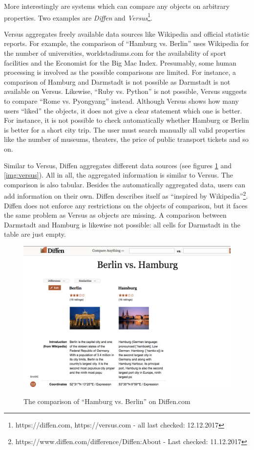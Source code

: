 More interestingly are systems which can compare any objects on arbitrary properties. Two examples are \emph{Diffen} and \emph{Versus}\footnote{https://diffen.com, https://versus.com - all last checked: 12.12.2017}.

Versus aggregates freely available data sources like Wikipedia and official statistic reports. For example, the comparison of \enquote{Hamburg vs. Berlin} uses Wikipedia for the number of universities, worldstadiums.com for the availability of sport facilities and the Economist for the Big Mac Index. Presumably, some human processing is involved as the possible comparisons are limited. For instance, a comparison of Hamburg and Darmstadt is not possible as Darmstadt is not available on Versus. Likewise, \enquote{Ruby vs. Python} is not possible, Versus suggests to compare \enquote{Rome vs. Pyongyang} instead. Although Versus shows how many users \enquote{liked} the objects, it does not give a clear statement which one is better. For instance, it is not possible to check automatically whether Hamburg or Berlin is better for a short city trip. The user must search manually all valid properties like the number of museums, theaters, the price of public transport tickets and so on.

Similar to Versus, Diffen aggregates different data sources (see figures \ref{img:diffen} and \ref{img:versus}). All in all, the aggregated information is similar to Versus. The comparison is also tabular. Besides the automatically aggregated data, users can add information on their own. Diffen describes itself as \enquote{inspired by Wikipedia}\footnote{https://www.diffen.com/difference/Diffen:About - Last checked: 11.12.2017}. Diffen does not enforce any restrictions on the objects of comparison, but it faces the same problem as Versus as objects are missing. A comparison between Darmstadt and Hamburg is likewise not possible: all cells for Darmstadt in the table are just empty.\newline

\begin{figure}[h]
\includegraphics[width=1\textwidth]{images/ds-sys/diffen}
\label{img:diffen}
\caption{The comparison of \enquote{Hamburg vs. Berlin} on Diffen.com}
\end{figure}

